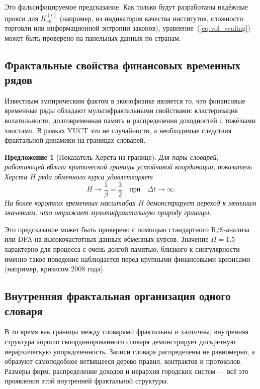 \documentclass[12pt,a4paper]{article}
\newtheorem{proposition}[theorem]{Предложение}
\theoremstyle{remark}
\begin{document}
	Это фальсифицируемое предсказание. Как только будут разработаны надёжные прокси для \(K_{\mathrm{eff}}^{(i)}\) (например, из индикаторов качества институтов, сложности торговли или информационной энтропии законов), уравнение~(\ref{eq:vol_scaling}) может быть проверено на панельных данных по странам.
	
	\subsection{Фрактальные свойства финансовых временных рядов}
	
	Известным эмпирическим фактом в эконофизике является то, что финансовые временные ряды обладают мультифрактальными свойствами: кластеризация волатильности, долговременная память и распределения доходностей с тяжёлыми хвостами. В рамках YUCT это не случайности, а необходимые следствия фрактальной динамики на границах словарей.
	
	\begin{proposition}[Показатель Херста на границе]
		Для пары словарей, работающей вблизи критической границы устойчивой координации, показатель Херста \(H\) ряда обменного курса удовлетворяет
		\begin{equation}
			H \to \frac{1}{\beta} = \frac{3}{2} \quad \text{при} \quad \Delta t \to \infty.
			\label{eq:hurst}
		\end{equation}
		На более коротких временных масштабах \(H\) демонстрирует переход к меньшим значениям, что отражает мультифрактальную природу границы.
	\end{proposition}
	
	Это предсказание может быть проверено с помощью стандартного R/S-анализа или DFA на высокочастотных данных обменных курсов. Значение \(H = 1.5\) характерно для процесса с очень долгой памятью, близкого к сингулярности — именно такое поведение наблюдается перед крупными финансовыми кризисами (например, кризисом 2008 года).
	
	\subsection{Внутренняя фрактальная организация одного словаря}
	
	В то время как границы между словарями фрактальны и хаотичны, внутренняя структура хорошо скоординированного словаря демонстрирует дискретную иерархическую упорядоченность. Записи словаря распределены не равномерно, а образуют самоподобное ветвящееся дерево правил, контрактов и протоколов. Размеры фирм, распределение доходов и иерархия городских систем — всё это проявления этой внутренней фрактальной структуры.
	
\end{document}
